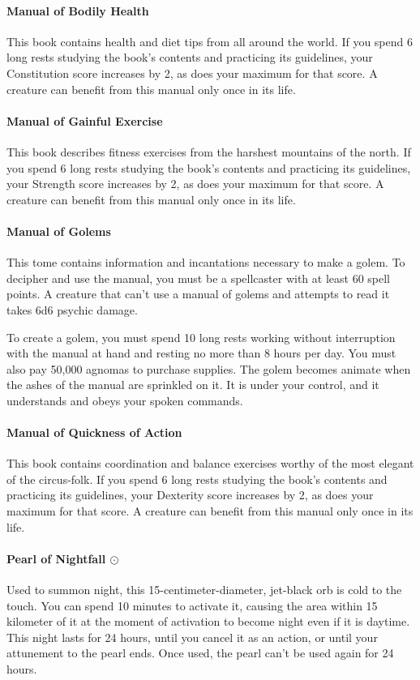     \paragraph{Manual of Bodily Health}
        This book contains health and diet tips from all around the world.
        If you spend 6 long rests studying the book's contents and practicing its guidelines, your Constitution score increases by 2, as does your maximum for that score.
        A creature can benefit from this manual only once in its life.
    \paragraph{Manual of Gainful Exercise}
        This book describes fitness exercises from the harshest mountains of the north.
        If you spend 6 long rests studying the book's contents and practicing its guidelines, your Strength score increases by 2, as does your maximum for that score.
        A creature can benefit from this manual only once in its life.
    \paragraph{Manual of Golems}
        This tome contains information and incantations necessary to make a golem.
        To decipher and use the manual, you must be a spellcaster with at least 60 spell points.
        A creature that can't use a manual of golems and attempts to read it takes 6d6 psychic damage.

        To create a golem, you must spend 10 long rests working without interruption with the manual at hand and resting no more than 8 hours per day.
        You must also pay 50,000 agnomas to purchase supplies.
        The golem becomes animate when the ashes of the manual are sprinkled on it.
        It is under your control, and it understands and obeys your spoken commands.
    \paragraph{Manual of Quickness of Action}
        This book contains coordination and balance exercises worthy of the most elegant of the circus-folk.
        If you spend 6 long rests studying the book's contents and practicing its guidelines, your Dexterity score increases by 2, as does your maximum for that score.
        A creature can benefit from this manual only once in its life.
    \paragraph{Pearl of Nightfall $\odot$}
        Used to summon night, this 15-centimeter-diameter, jet-black orb is cold to the touch.
        You can spend 10 minutes to activate it, causing the area within 15 kilometer of it at the moment of activation to become night even if it is daytime.
        This night lasts for 24 hours, until you cancel it as an action, or until your attunement to the pearl ends.
        Once used, the pearl can't be used again for 24 hours.
